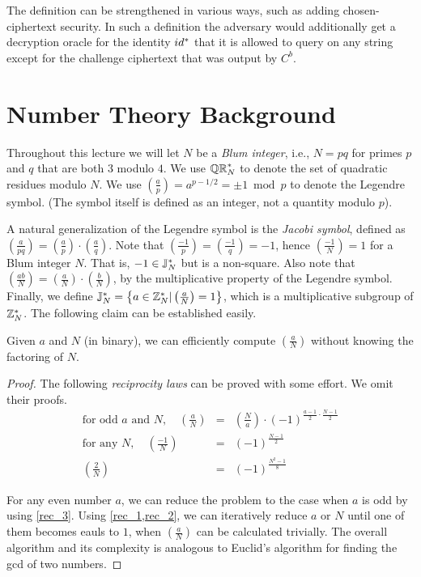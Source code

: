 \documentclass[11pt]{article}
\begin{document}
The definition can be strengthened in various ways, such as adding
chosen-ciphertext security.  In such a definition the adversary would
additionally get a decryption oracle for the identity $id^{*}$ that
it is allowed to query on any string except for the challenge
ciphertext that was output by $C^{b}$.

\section{Number Theory Background}
\label{sec:numb-theory-backgr}

Throughout this lecture we will let $N$ be a \textit{Blum integer},
i.e., $N = pq$ for primes $p$ and $q$ that are both $3$ modulo $4$.
We use $\mathbb{QR}_{N}^*$ to denote the set of quadratic residues modulo $N$.
We use $\left( \frac{a}{p} \right) = a^{p-1/2} = \pm 1 \bmod p$ to
denote the Legendre symbol.  (The symbol itself is defined as an
integer, not a quantity modulo $p$).

A natural generalization of the Legendre symbol is the \emph{Jacobi
  symbol}, defined as $\left( \frac{a}{pq}\right) = \left(
  \frac{a}{p}\right)\cdot \left( \frac{a}{q}\right)$.  Note that
$\left( \frac{-1}{p}\right) = \left( \frac{-1}{q} \right) = -1$, hence
$\left( \frac{-1}{N}\right) = 1$ for a Blum integer $N$.  That is, $-1
\in \mathbb{J}_N^{*}$ but is a non-square.  Also note that $\left(
  \frac{ab}{N}\right) = \left( \frac{a}{N}\right) \cdot \left(
  \frac{b}{N}\right)$, by the multiplicative property of the Legendre
symbol.  Finally, we define $\mathbb{J}_N^{*} = \left\{ a \in \mathbb{Z}^*_N |
  \left(\frac{a}{N}\right) = 1 \right\}$, which is a multiplicative
subgroup of $\mathbb{Z}_N^{*}$.  The following claim can be established easily.

\begin{claim}
  \label{compute_claim}
  Given $a$ and $N$ (in binary), we can efficiently compute $\left(
    \frac{a}{N}\right)$ without knowing the factoring of $N$.
\end{claim}

\begin{proof}
  The following \emph{reciprocity laws} can be proved with some
  effort.  We omit their proofs.
  \begin{eqnarray}
    \label{rec_1} \text{for odd $a$ and $N$}, \quad \left(\frac{a}{N}
    \right) &=& \left(\frac{N}{a} \right) \cdot \left( -1
    \right)^{\frac{a-1}{2}\cdot\frac{N-1}{2}} \\
    \label{rec_2} \text{for any } N, \quad \left(\frac{-1}{N} \right) &=&
    \left( -1 \right)^{\frac{N-1}{2}} \\
    \label{rec_3}\left(\frac{2}{N} \right) &=& \left( -1
    \right)^{\frac{N^2-1}{8}}
  \end{eqnarray}

  For any even number $a$, we can reduce the problem to the case when
  $a$ is odd by using \cref{rec_3}.  Using \cref{rec_1,rec_2}, we can
  iteratively reduce $a$ or $N$ until one of them becomes eauls to
  $1$, when $\left(\frac{a}{N} \right)$ can be calculated trivially.
  The overall algorithm and its complexity is analogous to Euclid's
  algorithm for finding the gcd of two numbers.
\end{proof}
\end{document}
